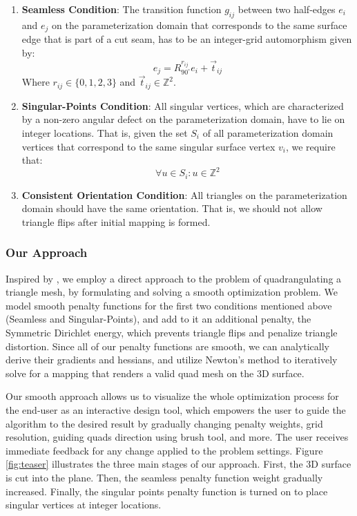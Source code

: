 \begin{enumerate}
  \item \textbf{Seamless Condition}: The transition function $g_{ij}$ between two half-edges $e_i$ and $e_j$ on the parameterization domain that corresponds to the same surface edge that is part of a cut seam, has to be an integer-grid automorphism given by:
  $$e_j = R^{r_{ij}}_{90^\circ}e_i + \vec{t}_{ij}$$
  Where  $r_{ij} \in \{0,1,2,3\}$ and $\vec{t}_{ij} \in \mathbb{Z}^2$.
  
  \item \textbf{Singular-Points Condition}: All singular vertices, which are characterized by a non-zero angular defect on the parameterization domain, have to lie on integer locations. That is, given the set $S_i$ of all parameterization domain vertices that correspond to the same singular surface vertex $v_i$, we require that:
  $$\forall u \in S_i: u \in \mathbb{Z}^2 $$
  
  \item \textbf{Consistent Orientation Condition}: All triangles on the parameterization domain should have the same orientation. That is, we should not allow triangle flips after initial mapping is formed.
\end{enumerate}

\subsubsection{Our Approach}
Inspired by \cite{Poranne:Autocuts:2017}, we employ a direct approach to the problem of quadrangulating a triangle mesh, by formulating and solving a smooth optimization problem. We model smooth penalty functions for the first two conditions mentioned above (Seamless and Singular-Points), and add to it an additional penalty, the Symmetric Dirichlet energy, which prevents triangle flips and penalize triangle distortion.
Since all of our penalty functions are smooth, we can analytically derive their gradients and hessians, and utilize Newton's method to iteratively solve for a mapping that renders a valid quad mesh on the 3D surface.

\noindent Our smooth approach allows us to visualize the whole optimization process for the end-user as an interactive design tool, which empowers the user to guide the algorithm to the desired result by gradually changing penalty weights, grid resolution, guiding quads direction using brush tool, and more. The user receives immediate feedback for any change applied to the problem settings. Figure \ref{fig:teaser} illustrates the three main stages of our approach. First, the 3D surface is cut into the plane. Then, the seamless penalty function weight gradually increased. Finally, the singular points penalty function is turned on to place singular vertices at integer locations.

